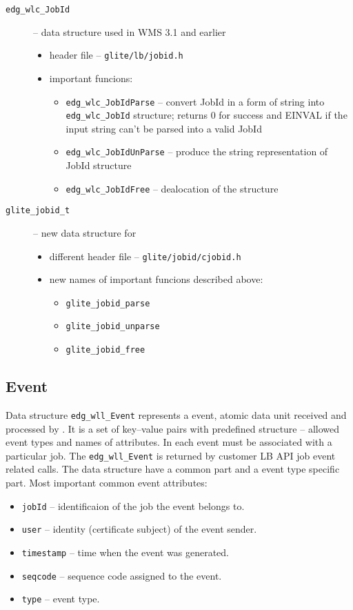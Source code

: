 \begin{description}
 \item [\texttt{edg\_wlc\_JobId}] -- data structure used in WMS 3.1 and earlier
  \begin{itemize}
   \item header file -- \texttt{glite/lb/jobid.h}
   \item important funcions:
    \begin{itemize}
     \item \texttt{edg\_wlc\_JobIdParse} -- convert JobId in a form of
      string into \texttt{edg\_wlc\_JobId} structure; returns 0 for
      success and EINVAL if the input string can't be parsed into a valid JobId
     \item \texttt{edg\_wlc\_JobIdUnParse} -- produce the string
      representation of JobId structure
     \item \texttt{edg\_wlc\_JobIdFree} -- dealocation of the structure
    \end{itemize}
  \end{itemize} 
 \item [\texttt{glite\_jobid\_t}] -- new data structure for  
  \begin{itemize}
   \item different header file -- \texttt{glite/jobid/cjobid.h}
   \item new names of important funcions described above:
    \begin{itemize}
     \item \texttt{glite\_jobid\_parse}
     \item \texttt{glite\_jobid\_unparse}
     \item \texttt{glite\_jobid\_free}
    \end{itemize}
  \end{itemize}
\end{description}

\subsection{Event}
Data structure \texttt{edg\_wll\_Event} represents a \LB event, atomic
data unit received and processed by \LB. It is a set of key--value
pairs with predefined structure -- allowed event types and names of
attributes. In \LB each event must be associated with a particular
job. The \texttt{edg\_wll\_Event} is returned by customer LB API job
event related calls. The data structure have a common part and a event
type specific part. Most important common event attributes:
\begin{itemize}
  \item \texttt{jobId} -- identificaion of the job the event belongs to.
  \item \texttt{user} -- identity (certificate subject) of the event sender.
  \item \texttt{timestamp} -- time when the event was generated.
  \item \texttt{seqcode} -- sequence code assigned to the event.
  \item \texttt{type} -- event type.
\end{itemize}

